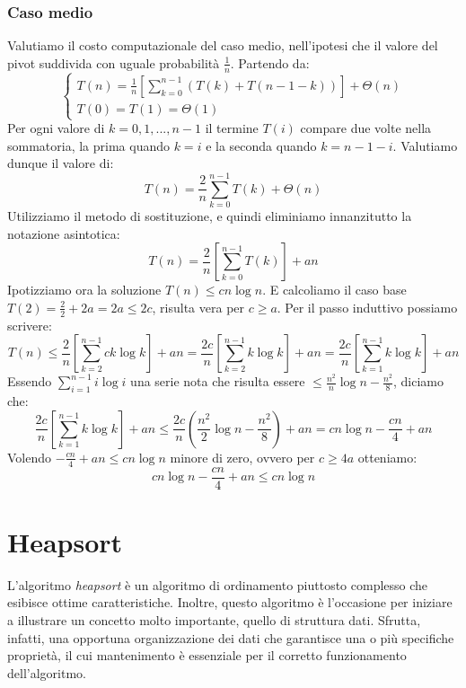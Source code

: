 \subsubsection{Caso medio}
Valutiamo il costo computazionale del caso medio, nell'ipotesi che il valore del pivot suddivida con uguale probabilità $\frac{1}{n}$.
Partendo da:
$$\begin{cases}
    T(n)=\frac{1}{n}[\sum^{n-1}_{k=0}(T(k)+T(n-1-k))]+\Theta(n)\\
    T(0)=T(1)=\Theta(1)
\end{cases}$$
Per ogni valore di $k=0,1,...,n-1$ il termine $T(i)$ compare due volte nella sommatoria, la prima quando $k=i$ e la seconda quando $k=n-1-i$.
Valutiamo dunque il valore di:
\begin{equation*}
    T(n)=\frac{2}{n}\sum^{n-1}_{k=0}T(k)+\Theta(n)
\end{equation*}
Utilizziamo il metodo di sostituzione, e quindi eliminiamo innanzitutto la notazione asintotica:
\begin{equation*}
    T(n)=\frac{2}{n}[\sum^{n-1}_{k=0}T(k)]+an
\end{equation*}
Ipotizziamo ora la soluzione $T(n) \leq cn\log n$. E calcoliamo il caso base $T(2)=\frac{2}{2}+2a=2a\leq2c$, risulta vera per $c\geq a$.
Per il passo induttivo possiamo scrivere:
\begin{equation*}
    T(n)\leq \frac{2}{n}[\sum^{n-1}_{k=2}ck\log k]+an=\frac{2c}{n}[\sum^{n-1}_{k=2}k\log k]+an=\frac{2c}{n}[\sum^{n-1}_{k=1}k\log k]+an
\end{equation*}
Essendo $\sum^{n-1}_{i=1}i\log i$ una serie nota che risulta essere $\leq \frac{n^2}{n}\log n-\frac{n^2}{8}$, diciamo che:
\begin{equation*}
    \frac{2c}{n}[\sum^{n-1}_{k=1}k\log k]+an\leq\frac{2c}{n}(\frac{n^2}{2}\log n-\frac{n^2}{8})+an=cn\log n-\frac{cn}{4}+an
\end{equation*}
Volendo $-\frac{cn}{4}+an\leq cn\log n$ minore di zero, ovvero per $c\geq4a$ otteniamo:
\begin{equation*}
    cn\log n-\frac{cn}{4}+an\leq cn\log n
\end{equation*}


\section{Heapsort}
L’algoritmo \textit{heapsort} è un algoritmo di ordinamento piuttosto complesso che esibisce ottime caratteristiche. Inoltre, questo algoritmo è l’occasione per iniziare a illustrare un concetto molto importante, quello di struttura dati. Sfrutta, infatti, una opportuna organizzazione dei dati che garantisce una o più specifiche proprietà, il cui mantenimento è essenziale per il corretto funzionamento dell'algoritmo.
